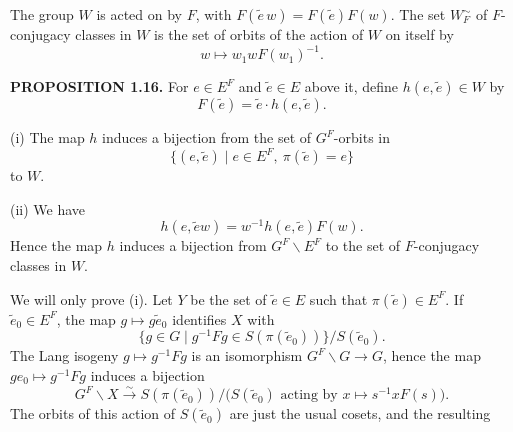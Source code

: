 \documentclass[9pt,twoside]{extarticle}
\begin{document}
{The group \(W\) is acted on by \(F\), with \(F(\widetilde e\,w)=F(\widetilde e)F(w)\). The set \(W_F^{\sim}\) of \(F\)-conjugacy classes in \(W\) is the set of orbits of the action of \(W\) on itself by \[
w\longmapsto w_1wF(w_1)^{-1}.
\]\par

\noindent\textbf{PROPOSITION 1.16.} For \(e\in E^F\) and \(\widetilde e\in E\) above it, define \(h(e,\widetilde e)\in W\) by \[
F(\widetilde e)=\widetilde e\cdot h(e,\widetilde e).
\]\par

(i) The map \(h\) induces a bijection from the set of \(G^F\)-orbits in \[
\{(e,\widetilde e)\mid e\in E^F,\ \pi(\widetilde e)=e\}
\] to \(W\).\par

(ii) We have \[
h(e,\widetilde e w)=w^{-1}h(e,\widetilde e)F(w).
\] Hence the map \(h\) induces a bijection from \(G^F\backslash E^F\) to the set of \(F\)-conjugacy classes in \(W\).\par

We will only prove (i). Let \(Y\) be the set of \(\widetilde e\in E\) such that \(\pi(\widetilde e)\in E^F\). If \(\widetilde e_0\in E^F\), the map \(g\mapsto g\widetilde e_0\) identifies \(X\) with \[
\{g\in G\mid g^{-1}Fg\in S(\pi(\widetilde e_0))\}/S(\widetilde e_0).
\] The Lang isogeny \(g\mapsto g^{-1}Fg\) is an isomorphism \(G^F\backslash G\to G\), hence the map \(ge_0\mapsto g^{-1}Fg\) induces a bijection \[
G^F\backslash X\xrightarrow{\sim}S(\pi(\widetilde e_0))/\bigl(S(\widetilde e_0)\text{ acting by }x\mapsto s^{-1}xF(s)\bigr).
\] The orbits of this action of \(S(\widetilde e_0)\) are just the usual cosets, and the resulting\par
}
\end{document}
